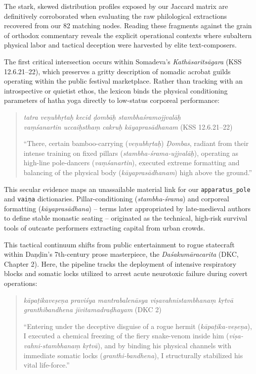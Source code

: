 \documentclass[11pt,twoside,letterpaper]{article}
\begin{document}
The stark, skewed distribution profiles exposed by our Jaccard matrix are definitively corroborated when evaluating the raw philological extractions recovered from our 82 matching nodes. Reading these fragments against the grain of orthodox commentary reveals the explicit operational contexts where subaltern physical labor and tactical deception were harvested by elite text-composers. 

The first critical intersection occurs within Somadeva's \textit{Kathāsaritsāgara} (KSS 12.6.21–22), which preserves a gritty description of nomadic acrobat guilds operating within the public festival marketplace. Rather than tracking with an introspective or quietist ethos, the lexicon binds the physical conditioning parameters of hatha yoga directly to low-status corporeal performance:

\begin{quote}
\small
\textit{tatra veṇubhṛtaḥ kecid ḍombāḥ stambhaśramojjvalāḥ \\
vaṃśanartin uccaiḥsthaṃ cakruḥ kāyaprasādhanam} (KSS 12.6.21–22)
\medskip

``There, certain bamboo-carrying (\textit{veṇubhṛtaḥ}) \textit{Ḍombas}, radiant from their intense training on fixed pillars (\textit{stambha-śrama-ujjvalāḥ}), operating as high-line pole-dancers (\textit{vaṃśanartin}), executed extreme formatting and balancing of the physical body (\textit{kāyaprasādhanam}) high above the ground.''
\end{quote}

This secular evidence maps an unassailable material link for our \texttt{apparatus\_pole} and \texttt{vaiṇa} dictionaries. Pillar-conditioning (\textit{stambha-śrama}) and corporeal formatting (\textit{kāyaprasādhana}) -- terms later appropriated by late-medieval authors to define stable monastic seating -- originated as the technical, high-risk survival tools of outcaste performers extracting capital from urban crowds.

This tactical continuum shifts from public entertainment to rogue statecraft within Daṇḍin's 7th-century prose masterpiece, the \textit{Daśakumāracarita} (DKC, Chapter 2). Here, the pipeline tracks the deployment of intensive respiratory blocks and somatic locks utilized to arrest acute neurotoxic failure during covert operations:

\begin{quote}
\small
\textit{kāpaṭikaveṣeṇa praviśya mantrabalenāsya viṣavahnistambhanaṃ kṛtvā granthibandhena jīvitamadraḍhayam} (DKC 2)
\medskip

``Entering under the deceptive disguise of a rogue hermit (\textit{kāpaṭika-veṣeṇa}), I executed a chemical freezing of the fiery snake-venom inside him (\textit{viṣa-vahni-stambhanaṃ kṛtvā}), and by binding his physical channels with immediate somatic locks (\textit{granthi-bandhena}), I structurally stabilized his vital life-force.''
\end{quote}
\end{document}
